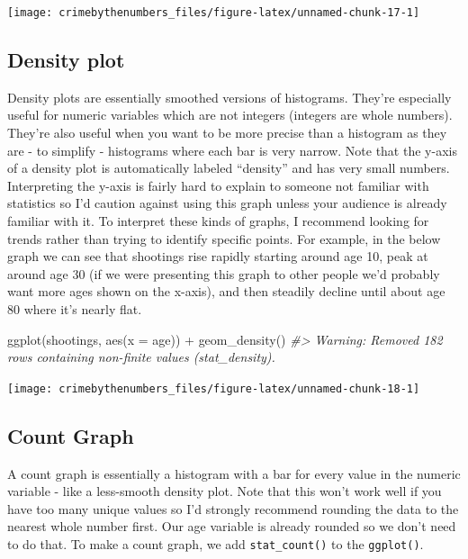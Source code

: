 \documentclass[
]{krantz}
\makeatletter
\newenvironment{Shaded}{\begin{snugshade}}{\end{snugshade}}
\newcommand{\AttributeTok}[1]{\textcolor[rgb]{0.61,0.61,0.61}{#1}}
\newcommand{\CommentTok}[1]{\textcolor[rgb]{0.37,0.37,0.37}{\textit{#1}}}
\newcommand{\FunctionTok}[1]{\textcolor[rgb]{0,0,0}{#1}}
\newcommand{\NormalTok}[1]{#1}
\newcommand{\SpecialCharTok}[1]{\textcolor[rgb]{0,0,0}{#1}}
\newenvironment{kframe}{%
\medskip{}
\setlength{\fboxsep}{.8em}
 \def\at@end@of@kframe{}%
 \ifinner\ifhmode%
  \def\at@end@of@kframe{\end{minipage}}%
  \begin{minipage}{\columnwidth}%
 \fi\fi%
 \def\FrameCommand##1{\hskip\@totalleftmargin \hskip-\fboxsep
 \colorbox{shadecolor}{##1}\hskip-\fboxsep
     \hskip-\linewidth \hskip-\@totalleftmargin \hskip\columnwidth}%
 \MakeFramed {\advance\hsize-\width
   \@totalleftmargin\z@ \linewidth\hsize
   \@setminipage}}%
 {\par\unskip\endMakeFramed%
 \at@end@of@kframe}
\renewenvironment{Shaded}{\begin{kframe}}{\end{kframe}}
\makeatother
\begin{document}
\begin{center}\texttt{[image: crimebythenumbers\_files/figure-latex/unnamed-chunk-17-1]} \end{center}

\hypertarget{density-plot}{%
\subsection{Density plot}\label{density-plot}}

Density plots are essentially smoothed versions of histograms. They're especially useful for numeric variables which are not integers (integers are whole numbers). They're also useful when you want to be more precise than a histogram as they are - to simplify - histograms where each bar is very narrow. Note that the y-axis of a density plot is automatically labeled ``density'' and has very small numbers. Interpreting the y-axis is fairly hard to explain to someone not familiar with statistics so I'd caution against using this graph unless your audience is already familiar with it. To interpret these kinds of graphs, I recommend looking for trends rather than trying to identify specific points. For example, in the below graph we can see that shootings rise rapidly starting around age 10, peak at around age 30 (if we were presenting this graph to other people we'd probably want more ages shown on the x-axis), and then steadily decline until about age 80 where it's nearly flat.

\begin{Shaded}
\begin{Highlighting}[]
\FunctionTok{ggplot}\NormalTok{(shootings, }\FunctionTok{aes}\NormalTok{(}\AttributeTok{x =}\NormalTok{ age)) }\SpecialCharTok{+} 
  \FunctionTok{geom\_density}\NormalTok{()}
\CommentTok{\#\textgreater{} Warning: Removed 182 rows containing non{-}finite values (stat\_density).}
\end{Highlighting}
\end{Shaded}

\begin{center}\texttt{[image: crimebythenumbers\_files/figure-latex/unnamed-chunk-18-1]} \end{center}

\hypertarget{count-graph}{%
\subsection{Count Graph}\label{count-graph}}

A count graph is essentially a histogram with a bar for every value in the numeric variable - like a less-smooth density plot. Note that this won't work well if you have too many unique values so I'd strongly recommend rounding the data to the nearest whole number first. Our age variable is already rounded so we don't need to do that. To make a count graph, we add \texttt{stat\_count()} to the \texttt{ggplot()}.
\end{document}
